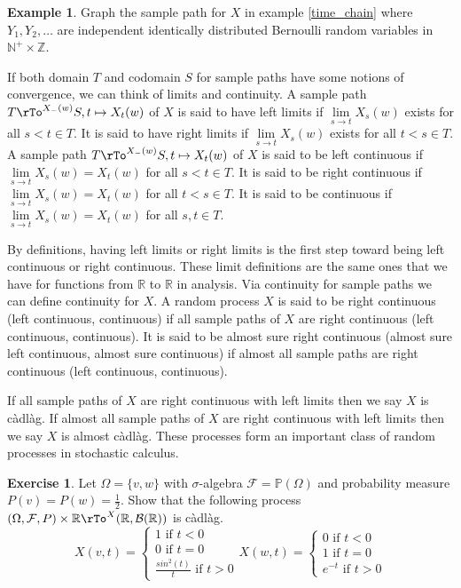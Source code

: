 \documentclass[12pt]{amsart}
\theoremstyle{definition}
\newtheorem{example}[theorem]{Example}
\newtheorem{exercise}[theorem]{Exercise}
\begin{document}
\begin{example} \label{time_chain_1} Graph the sample path for $X$ in example \ref{time_chain} where $Y_1, Y_2, \dots$ are independent identically distributed Bernoulli random variables in $\mathbb{N}^+ \times \mathbb{Z}$.
\end{example}

If both domain $T$ and codomain $S$ for sample paths have some notions of convergence, we can think of limits and continuity.
\dfn A sample path $T \rTo^{X_- (w)} S, t \mapsto X_t(w)$ of $X$ is said to have left limits if $\lim\limits_{s \to t} X_s(w)$ exists for all $s < t \in T$. It is said to have right limits if $\lim\limits_{s \to t} X_s(w)$ exists for all $t < s \in T$.
\dfn A sample path $T \rTo^{X_- (w)} S, t \mapsto X_t(w)$ of $X$ is said to be left continuous if $\lim\limits_{s \to t} X_s(w) = X_t(w)$ for all $s < t \in T$. It is said to be right continuous if $\lim\limits_{s \to t} X_s(w) = X_t(w)$ for all $t < s \in T$. It is said to be continuous if $\lim\limits_{s \to t} X_s(w) = X_t(w)$ for all $s, t \in T$.

By definitions, having left limits or right limits is the first step toward being left continuous or right continuous. These limit definitions are the same ones that we have for functions from $\mathbb{R}$ to $\mathbb{R}$ in analysis. Via continuity for sample paths we can define continuity for $X$.
\dfn\label{continuous_process} A random process $X$ is said to be right continuous (left continuous, continuous) if all sample paths of $X$ are right continuous (left continuous, continuous). It is said to be almost sure right continuous (almost sure left continuous, almost sure continuous) if almost all sample paths are right continuous (left continuous, continuous).

If all sample paths of $X$ are right continuous with left limits then we say $X$ is c\`{a}dl\`{a}g. If almost all sample paths of $X$ are right continuous with left limits then we say $X$ is almost c\`{a}dl\`{a}g. These processes form an important class of random processes in stochastic calculus.

\begin{exercise} Let $\Omega = \{v,w\}$ with $\sigma$-algebra $\mathcal{F} = \mathbb{P}(\Omega)$ and probability measure $P(v) = P(w) = \frac{1}{2}$. Show that the following process $(\Omega, \mathcal{F}, P) \times \mathbb{R} \rTo^X (\mathbb{R}, \mathcal{B}(\mathbb{R}))$ is c\`{a}dl\`{a}g.
$$X(v, t) = \begin{cases} 1 \text{ if } t < 0 \\ 0 \text{ if } t = 0 \\ \frac{sin^2(t)}{t} \text{ if } t > 0 \end{cases}
X(w, t) = \begin{cases} 0 \text{ if } t < 0 \\ 1 \text{ if } t = 0 \\ e^{-t} \text{ if } t > 0 \end{cases}
$$
\end{exercise}
\end{document}
